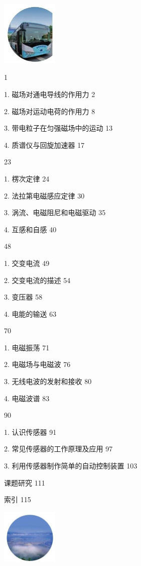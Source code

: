 \documentclass[10pt]{article}
\begin{document}
\begin{center}
\includegraphics[max width=0.2\textwidth]{images/01910e72-c5b7-7ed5-a6d4-fb3a5faefc32_4_932038.jpg}
\end{center}

1

1. 磁场对通电导线的作用力 2

2. 磁场对运动电荷的作用力 8

3. 带电粒子在匀强磁场中的运动 13

4. 质谱仪与回旋加速器 17

23

1. 楞次定律 24

2. 法拉第电磁感应定律 30

3. 涡流、电磁阻尼和电磁驱动 35

4. 互感和自感 40

48

1. 交变电流 49

2. 交变电流的描述 54

3. 变压器 58

4. 电能的输送 63

70

1. 电磁振荡 71

2. 电磁场与电磁波 76

3. 无线电波的发射和接收 80

4. 电磁波谱 83

90

1. 认识传感器 91

2. 常见传感器的工作原理及应用 97

3. 利用传感器制作简单的自动控制装置 103

课题研究 111

索引 115

\begin{center}
\includegraphics[max width=0.2\textwidth]{images/01910e72-c5b7-7ed5-a6d4-fb3a5faefc32_4_418457.jpg}
\end{center}
\end{document}
